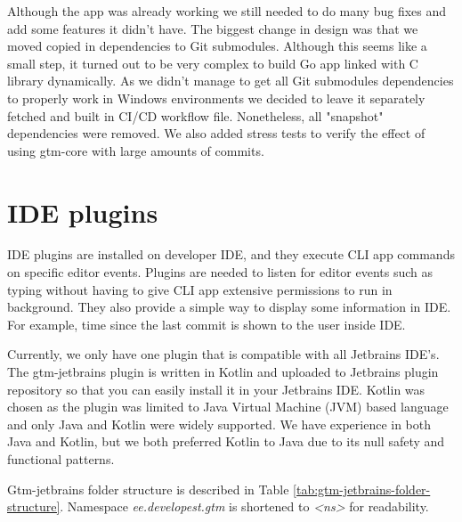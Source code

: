 Although the app was already working we still needed to do many bug fixes and add some features it didn't have.
The biggest change in design was that we moved copied in dependencies to Git submodules.
Although this seems like a small step, it turned out to be very complex to build Go app linked with C library dynamically.
As we didn't manage to get all Git submodules dependencies to properly work in Windows environments
we decided to leave it separately fetched and built in CI/CD workflow file.
Nonetheless, all "snapshot" dependencies were removed.
We also added stress tests to verify the effect of using gtm-core with large amounts of commits.

\section{IDE plugins}\label{sec:ide-plugins}
IDE plugins are installed on developer IDE, and they execute CLI app commands on specific editor events.
Plugins are needed to listen for editor events such as typing without having to give CLI app extensive permissions to run in background.
They also provide a simple way to display some information in IDE.
For example, time since the last commit is shown to the user inside IDE.

Currently, we only have one plugin that is compatible with all Jetbrains IDE's.
The gtm-jetbrains plugin is written in Kotlin and uploaded to Jetbrains plugin repository so that you can easily install it in your Jetbrains IDE.
Kotlin was chosen as the plugin was limited to Java Virtual Machine (JVM) based language and only Java and Kotlin were widely supported.
We have experience in both Java and Kotlin, but we both preferred Kotlin to Java due to its null safety and functional patterns.

Gtm-jetbrains folder structure is described in Table
\ref{tab:gtm-jetbrains-folder-structure}.
Namespace \textit{ee.developest.gtm} is shortened to \textit{<ns>} for readability.

